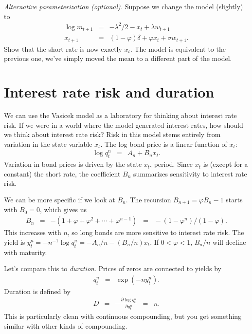 \documentclass[11pt]{article}
\begin{document}
{\it Alternative parameterization (optional).\/}
Suppose we change the model (slightly) to
\begin{eqnarray*}
    \log m_{t+1} &=& - \lambda^2/2 - x_t + \lambda w_{t+1} \\
         x_{t+1} &=& (1-\varphi) \delta + \varphi x_t + \sigma w_{t+1} .
\end{eqnarray*}
Show that the short rate is now exactly $x_t$.
The model is equivalent to the previous one,
we've simply moved the mean to a different part of the model.

\section{Interest rate risk and duration}

We can use the Vasicek model as a laboratory for thinking about interest rate risk.
If we were in a world where the model generated interest rates,
how should we think about interest rate risk?
Risk in this model stems entirely from variation in the state variable $x_t$.
The log bond price is a linear function of $x_t$:
\begin{eqnarray*}
    \log q^n_t &=& A_n + B_n x_t .
\end{eqnarray*}
Variation in bond prices is driven by the state $x_t$, period.
Since $x_t$ is (except for a constant) the short rate,
the coefficient $B_n$ summarizes sensitivity to interest rate risk.

We can be more specific if we look at $B_n$.
The recursion $B_{n+1} = \varphi B_n - 1$ starts with $B_0 = 0$,
which gives us
\begin{eqnarray*}
    B_n &=& - (1 + \varphi + \varphi^2 + \cdots + \varphi^{n-1})
            \;\;=\;\; -(1-\varphi^n)/(1-\varphi) .
\end{eqnarray*}
This increases with $n$, so long bonds are more sensitive to interest rate risk.
The yield is $y^n_t = -n^{-1} \log q^n_t = - A_n/n - (B_n/n) x_t$.
If $0 < \varphi < 1$,
$B_n/n$ will decline with maturity.

Let's compare this to {\it duration\/}.
Prices of zeros are connected to yields by
\begin{eqnarray*}
    q^n_t &=& \exp( - n y^n_t ).
\end{eqnarray*}
Duration is defined by
\begin{eqnarray*}
    D &=& - \frac{\partial \log q^n_t}{\partial y^n_t} \;\;=\;\; n.
\end{eqnarray*}
This is particularly clean with continuous compounding,
but you get something similar with other kinds of compounding.
\end{document}
